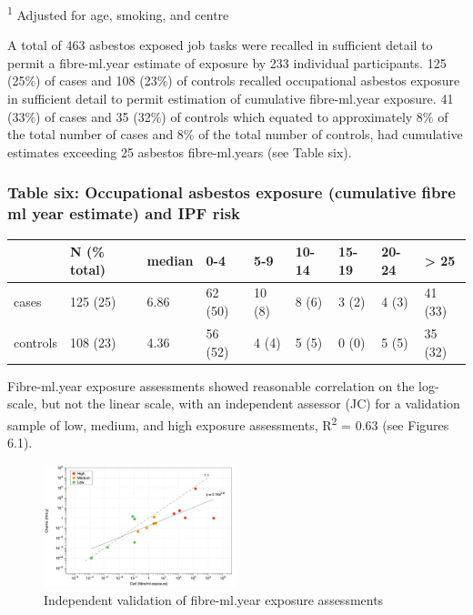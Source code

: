 \documentclass[
]{article}
\begin{document}
\textsuperscript{1} Adjusted for age, smoking, and centre

A total of 463 asbestos exposed job tasks were recalled in sufficient
detail to permit a fibre-ml.year estimate of exposure by 233 individual
participants. 125 (25\%) of cases and 108 (23\%) of controls recalled
occupational asbestos exposure in sufficient detail to permit estimation
of cumulative fibre-ml.year exposure. 41 (33\%) of cases and 35 (32\%)
of controls which equated to approximately 8\% of the total number of
cases and 8\% of the total number of controls, had cumulative estimates
exceeding 25 asbestos fibre-ml.years (see Table six).

\newpage

\hypertarget{table-six-occupational-asbestos-exposure-cumulative-fibre-ml-year-estimate-and-ipf-risk}{%
\subsubsection{Table six: Occupational asbestos exposure (cumulative
fibre ml year estimate) and IPF
risk}\label{table-six-occupational-asbestos-exposure-cumulative-fibre-ml-year-estimate-and-ipf-risk}}

\begin{longtable}[]{@{}lllllllll@{}}
\toprule
& N (\% total) & median & 0-4 & 5-9 & 10-14 & 15-19 & 20-24 &
\textgreater{} 25\tabularnewline
\midrule
\endhead
cases & 125 (25) & 6.86 & 62 (50) & 10 (8) & 8 (6) & 3 (2) & 4 (3) & 41
(33)\tabularnewline
controls & 108 (23) & 4.36 & 56 (52) & 4 (4) & 5 (5) & 0 (0) & 5 (5) &
35 (32)\tabularnewline
\bottomrule
\end{longtable}

Fibre-ml.year exposure assessments showed reasonable correlation on the
log-scale, but not the linear scale, with an independent assessor (JC)
for a validation sample of low, medium, and high exposure assessments,
R\textsuperscript{2} = 0.63 (see Figures 6.1).

\begin{figure}
\centering
\includegraphics[width=0.5\textwidth,height=\textheight]{source/figures/cherrie_validation.png}
\caption{Independent validation of fibre-ml.year exposure assessments}
\end{figure}
\end{document}

